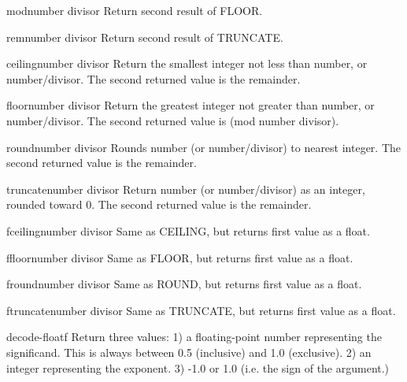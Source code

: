 \begin{function}{mod}{number divisor}{}{}
  Return second result of FLOOR.
\end{function}

\begin{function}{rem}{number divisor}{}{}
  Return second result of TRUNCATE.
\end{function}

\begin{function}{ceiling}{number \op divisor}{}{}
  Return the smallest integer not less than number, or number/divisor.
  The second returned value is the remainder.
\end{function}

\begin{function}{floor}{number \op divisor}{}{}
  Return the greatest integer not greater than number, or number/divisor.
  The second returned value is (mod number divisor).
\end{function}

\begin{function}{round}{number \op divisor}{}{}
  Rounds number (or number/divisor) to nearest integer.
  The second returned value is the remainder.
\end{function}

\begin{function}{truncate}{number \op divisor}{}{}
  Return number (or number/divisor) as an integer, rounded toward 0.
  The second returned value is the remainder.
\end{function}

\begin{function}{fceiling}{number \op divisor}{}{}
  Same as CEILING, but returns first value as a float.
\end{function}

\begin{function}{ffloor}{number \op divisor}{}{}
  Same as FLOOR, but returns first value as a float.
\end{function}

\begin{function}{fround}{number \op divisor}{}{}
  Same as ROUND, but returns first value as a float.
\end{function}

\begin{function}{ftruncate}{number \op divisor}{}{}
  Same as TRUNCATE, but returns first value as a float.
\end{function}

\begin{function}{decode-float}{f}{}{}
  Return three values:
   1) a floating-point number representing the significand. This is always
      between 0.5 (inclusive) and 1.0 (exclusive).
   2) an integer representing the exponent.
   3) -1.0 or 1.0 (i.e. the sign of the argument.)
\end{function}

